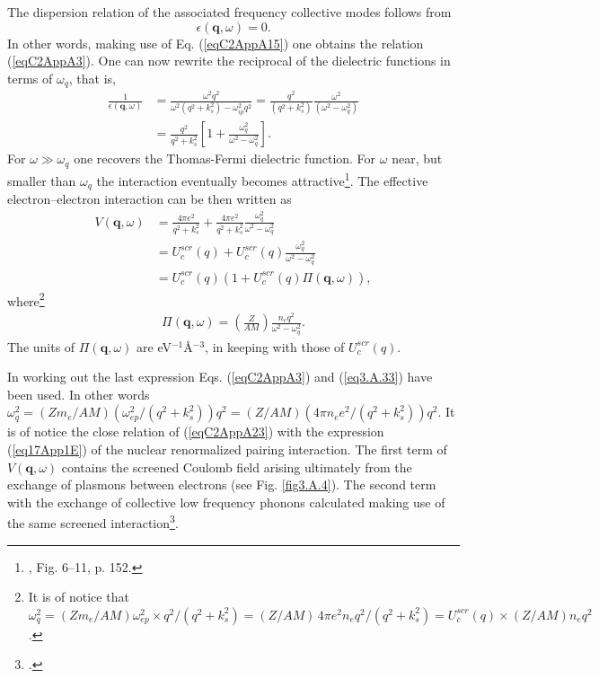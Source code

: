 The dispersion relation of the associated frequency collective modes follows from
\begin{equation}\label{eqC2AppA21}
\epsilon(\mathbf q,\omega)=0.
\end{equation}
In other words, making use of Eq. (\ref{eqC2AppA15}) one obtains the relation (\ref{eqC2AppA3}). One can now rewrite the reciprocal of the dielectric functions in terms of $\omega_{q}$, that is,
\begin{align}\label{eqC2AppA22}
\nonumber \frac{1}{\epsilon(\mathbf q,\omega)}&=\frac{\omega^2q^2}{\omega^2(q^2+k_s^2)-\omega_{ip}^2q^2}=\frac{q^2}{(q^2+k_s^2)}\frac{\omega^2}{(\omega^2-\omega_q^2)}\\
&=\frac{q^2}{q^2+k_s^2}\left[1+\frac{\omega_q^2}{\omega^2-\omega_q^2}\right].
\end{align}
For $\omega\gg \omega_q$ one recovers the Thomas-Fermi dielectric function. For $\omega$ near, but smaller than $\omega_q$ the interaction eventually becomes   attractive\footnote{\cite{Schrieffer:64}, Fig. 6--11, p. 152.}. The effective electron--electron interaction can be then written as
\begin{align}\label{eqC2AppA23}
\nonumber V(\mathbf q,\omega)&=\frac{4\pi  e^2}{q^2+k_s^2}+\frac{4\pi  e^2}{q^2+k_s^2}\frac{\omega_q^2}{\omega^2-\omega_q^2}\\
\nonumber &=U^{scr}_c(q)+U_c^{scr}(q)\frac{\omega_q^2}{\omega^2-\omega_q^2}\\
&=U^{scr}_c(q)\left(1+U^{scr}_c(q)\Pi(\mathbf q,\omega)\right),
\end{align}
where\footnote{It is of notice that $\omega_q^2=\left(Zm_e/AM\right)\omega^2_{ep}\times q^2/(q^2+k_s^2)=(Z/AM)\,4\pi e^2 n_e q^2 /(q^2+k_s^2)=U^{scr}_c(q)\times(Z/AM)n_e q^2$.}
\begin{align}\label{eqC2AppA24}
\Pi(\mathbf q,\omega)=\left(\frac{Z}{AM}\right)\frac{n_e q^2}{\omega^2-\omega_q^2}.
\end{align}
The units of $\Pi(\mathbf q,\omega)$ are eV$^{-1}$\AA$^{-3}$, in keeping with those of $U_c^{scr}(q)$.


In working out the last expression Eqs. (\ref{eqC2AppA3}) and (\ref{eq3.A.33}) have been used. In other words $\omega_q^2=(Zm_e/AM)(\omega^2_{ep}/(q^2+k_s^2))q^2=(Z/AM)(4\pi n_ee^2/(q^2+k_s^2))q^2$.
It is of notice the close relation of (\ref{eqC2AppA23}) with the expression (\ref{eq17App1E}) of the nuclear renormalized pairing interaction. The first term of $V(\mathbf q,\omega)$ contains the screened Coulomb field arising ultimately from the exchange of plasmons between electrons (see Fig. \ref{fig3.A.4}). The second term with the exchange of collective low frequency phonons calculated making use of the same screened interaction\footnote{\cite{Lindhard:53}.}.  


